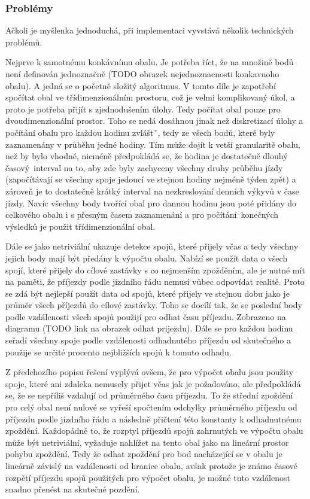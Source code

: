 \subsubsection{Problémy}

Ačkoli je myšlenka jednoduchá, při implementaci vyvstává několik technických problémů.

\bigbreak

Nejprve k samotnému konkávnímu obalu. Je potřeba říct, že na množině bodů není definován jednoznačně (TODO obrazek nejednoznacnosti konkavnoho obalu). A jedná se o početně složitý algoritmus. V tomto díle je zapotřebí spočítat obal ve třídimenzionálním prostoru, což je velmi komplikovaný úkol, a proto je potřeba přijít s zjednodušením úlohy. Tedy počítat obal pouze pro dvoudimenzionální prostor. Toho se nedá dosáhnou jinak než diskretizací úlohy a počítání obalu pro každou hodinu zvláštˇ, tedy ze všech bodů, které byly zaznamenány v průběhu jedné hodiny. Tím může dojít k vetší granularitě obalu, než by bylo vhodné, nicméně předpokládá se, že hodina je dostatečně dlouhý časový interval na to, aby zde byly zachyceny všechny druhy průběhu jízdy (započítávají se všechny spoje jedoucí ve stejnou hodiny nejméně týden zpět) a zároveň je to dostatečně krátký interval na nezkreslování denních výkyvů v čase jízdy. Navíc všechny body tvořící obal pro dannou hodinu jsou poté přidány do celkového obalu i s přesným časem zaznamenání a pro počítání konečných výsledků je použit třídimenzionální obal.

\bigbreak

Dále se jako netriviální ukazuje detekce spojů, které přijely včas a tedy všechny jejich body mají být předány k výpočtu obalu. Nabízí se použít data o všech spojí, které přijely do cílové zastávky s co nejmenším zpožděním, ale je nutné mít na paměti, že příjezdy podle jízdního řádu nemusí vůbec odpovídat realitě. Proto se zdá být nejlepší použít data od spojů, které přijely ve stejnou dobu jako je průměr všech příjezdů do cílové zastávky. Toho se docílí tak, že se poslední body podle vzdálenosti všech spojů použijí pro odhat času příjezdu. Zobrazeno na diagramu (TODO link na obrazek odhat prijezdu). Dále se pro každou hodinu seřadí všechny spoje podle vzdálenosti odhadnutého příjezdu od skutečného a použije se určité procento nejbližších spojů k tomuto odhadu.

\bigbreak

Z předchozího popisu řešení vyplývá ovšem, že pro výpočet obalu jsou použity spoje, které ani zdaleka nemusely přijet včas jak je požadováno, ale předpokládá se, že se nepříliš vzdalují od průměrného času příjezdu. To že střední zpoždění pro celý obal není nulové se vyřeší spočtením odchylky průměrného příjezdu od příjezdu podle jízdního řádu a následně přičtení této konstanty k odhadnutnému zpoždění. Každopádně to, že rozptyl příjezdů spojů zahrnutých ve výpočtu obalu může být netriviální, vyžaduje nahlížet na tento obal jako na lineární prostor pohybu zpoždění. Tedy že odhat zpoždění pro bod nacházející se v obalu je lineárně závislý na vzdálenosti od hranice obalu, avšak protože je známo časové rozpětí příjezdu spojů použitých pro výpočet obalu, je možné tuto vzdálenost snadno přenést na skutečné pozdění.


